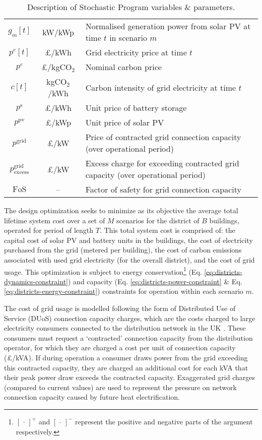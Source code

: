 \begin{table}[hp]
{\begin{tabularx}{1.05\linewidth}{ccX}
        $g_m[t]$ & kW/kWp & Normalised generation power from solar PV at time $t$ in scenario $m$ \\
        $p^e[t]$ & £/kWh & Grid electricity price at time $t$ \\
        $p^c$ & £/kgCO$_2$ & Nominal carbon price \\
        $c[t]$ & kgCO$_2$/kWh & Carbon intensity of grid electricity at time $t$ \\
        $p^{\textrm{s}}$ & £/kWh & Unit price of battery storage \\
        $p^{\textrm{pv}}$ & £/kWp & Unit price of solar PV \\
        $p^{\text{grid}}$ & £/kW & Price of contracted grid connection capacity (over operational period) \\
        $p^{\text{grid}}_{\text{excess}}$ & £/kW & Excess charge for exceeding contracted grid capacity (over operational period) \\
        $\text{FoS}$ & -- & Factor of safety for grid connection capacity \\
        \bottomrule \bottomrule
    \end{tabularx}
    }
    \smallskip
    \caption{Description of Stochastic Program variables \& parameters.} \label{tab:districts-LP-params}
\end{table}
\hfill

\newpage
The design optimization seeks to minimize as its objective the average total lifetime system cost over a set of $M$ scenarios for the district of $B$ buildings, operated for period of length $T$. This total system cost is comprised of: the capital cost of solar PV and battery units in the buildings, the cost of electricity purchased from the grid (metered per building), the cost of carbon emissions associated with used grid electricity (for the overall district), and the cost of grid usage.
This optimization is subject to energy conservation\footnote{$[\,\cdot\,]^+$ and $[\,\cdot\,]^-$ represent the positive and negative parts of the argument respectively.} (Eq. \ref{eq:districts-dynamics-constraint}) and capacity (Eq. \ref{eq:districts-power-constraint} \& Eq. \ref{eq:districts-energy-constraint}) constraints for operation within each scenario $m$.

The cost of grid usage is modelled following the form of Distributed Use of Service (DUoS) connection capacity charges, which are the costs charged to large electricity consumers connected to the distribution network in the UK \citep{acha2022ModellingUKElectricity,frontiereconomics2022NetworkTariffsEnergy}. These consumers must request a `contracted' connection capacity from the distribution operator, for which they are charged a cost per unit of connection capacity (£/kVA). If during operation a consumer draws power from the grid exceeding this contracted capacity, they are charged an additional cost for each kVA that their peak power draw exceeds the contracted capacity. Exaggerated grid charges (compared to current values) are used to represent the pressure on network connection capacity caused by future heat electrification.

